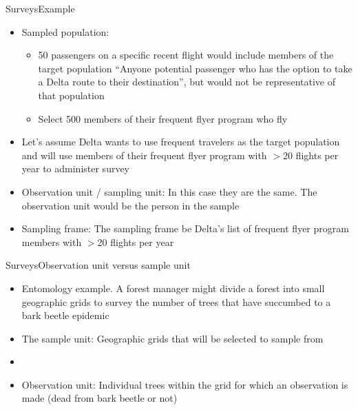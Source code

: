 \documentclass[xcolor=dvipsnames]{beamer}
\begin{document}
\begin{frame}{Surveys}{Example}
	\begin{itemize}
		\item Sampled population:
		\begin{itemize}
			\item 50 passengers on a specific recent flight would include members of the target population ``Anyone potential passenger who has the option to take a Delta route to their destination'', but would not be representative of that population
			\item Select 500 members of their frequent flyer program who fly
		\end{itemize}
	
	\item Let's assume Delta wants to use frequent travelers as the target population and will use members of their frequent flyer program with $>$20 flights per year to administer survey
	
	\item Observation unit / sampling unit: In this case they are the same. The observation unit would be the person in the sample
	
	\item Sampling frame: The sampling frame be Delta's list of frequent flyer program members with $>$20 flights per year
	\end{itemize}
\end{frame}

\begin{frame}{Surveys}{Observation unit versus sample unit}
\begin{itemize}
	\item  Entomology example. A forest manager might divide a forest into small geographic grids to survey the number of trees that have succumbed to a bark beetle epidemic 
\end{itemize}
	\begin{itemize}
		\item The sample unit: Geographic grids that will be selected to sample from
		\item[]
		\item Observation unit: Individual trees within the grid for which an observation is made (dead from bark beetle or not)
	\end{itemize}
\end{frame}
\end{document}
